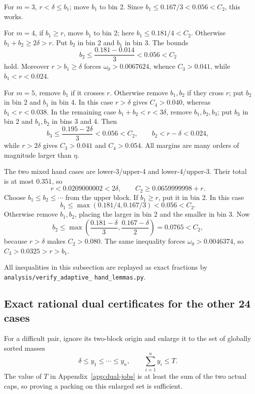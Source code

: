 \documentclass[11pt]{article}
\theoremstyle{definition}
\theoremstyle{remark}
\newcommand{\etaP}{\eta}
\begin{document}
For \(m=3\), \(r<\delta\leq b_1\); move \(b_1\) to bin 2.  Since
\(b_1\leq0.167/3<0.056<C_2\), this works.

For \(m=4\), if \(b_1\geq r\), move \(b_1\) to bin 2; here
\(b_1\leq0.181/4<C_2\).  Otherwise
\(b_1+b_2\geq2\delta>r\).  Put \(b_2\) in bin 2 and \(b_1\) in bin 3.
The bounds
\[
 b_2\leq\frac{0.181-0.014}{3}<0.056<C_2
\]
hold.  Moreover \(r>b_1\geq\delta\) forces
\(\omega_0>0.0067624\), whence \(C_3>0.041\), while
\(b_1<r<0.024\).

For \(m=5\), remove \(b_1\) if it crosses \(r\).  Otherwise remove
\(b_1,b_2\) if they cross \(r\); put \(b_2\) in bin 2 and \(b_1\) in bin 4.
In this case \(r>\delta\) gives \(C_4>0.040\), whereas
\(b_1<r<0.038\).  In the remaining case
\(b_1+b_2<r<3\delta\), remove \(b_1,b_2,b_3\); put \(b_3\) in bin 2 and
\(b_1,b_2\) in bins 3 and 4.  Then
\[
 b_3\leq\frac{0.195-2\delta}{3}<0.056<C_2,
 \qquad b_2<r-\delta<0.024,
\]
while \(r>2\delta\) gives \(C_3>0.041\) and \(C_4>0.054\).
All margins are many orders of magnitude larger than \(\etaP\).

The two mixed hand cases are lower-3/upper-4 and lower-4/upper-3.  Their total
is at most \(0.351\), so
\[
 r<0.0209000002<2\delta,
 \qquad C_2\geq0.0659999998+r.
\]
Choose \(b_1\leq b_2\leq\cdots\) from the upper block.  If
\(b_1\geq r\), put it in bin 2.  In this case
\[
 b_1\leq\max(0.181/4,0.167/3)<0.056<C_2.
\]
Otherwise remove
\(b_1,b_2\), placing the larger in bin 2 and the smaller in bin 3.  Now
\[
 b_2\leq\max\left(\frac{0.181-\delta}{3},
                   \frac{0.167-\delta}{2}\right)
     =0.0765<C_2,
\]
because \(r>\delta\) makes \(C_2>0.080\).  The same inequality forces
\(\omega_0>0.0046374\), so \(C_3>0.0325>r>b_1\).

All inequalities in this subsection are replayed as exact fractions by
\texttt{analysis/verify\_adaptive\_}\allowbreak
\texttt{hand\_lemmas.py}.

\subsection{Exact rational dual certificates for the other 24 cases}
\label{sec:dual}

For a difficult pair, ignore its two-block origin and enlarge it to the set of
globally sorted masses
\[
 \delta\leq y_1\leq\cdots\leq y_n,
 \qquad \sum_{i=1}^ny_i\leq T.
\]
The value of \(T\) in Appendix~\ref{app:dual-jobs} is at least the sum of the
two actual caps, so proving a packing on this enlarged set is sufficient.
\end{document}
